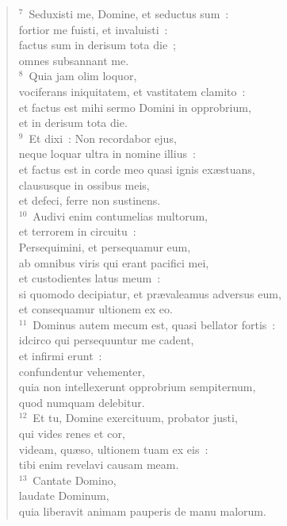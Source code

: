 \begin{flushleft}\begin{verse}${}^{7}$~Seduxisti me, Domine, et seductus sum~:\\ fortior me fuisti, et invaluisti~:\\ factus sum in derisum tota die~;\\ omnes subsannant me.\\
${}^{8}$~Quia jam olim loquor,\\ vociferans iniquitatem, et vastitatem clamito~:\\ et factus est mihi sermo Domini in opprobrium,\\ et in derisum tota die.\\
${}^{9}$~Et dixi~: Non recordabor ejus,\\ neque loquar ultra in nomine illius~:\\ et factus est in corde meo quasi ignis ex\ae stuans,\\ claususque in ossibus meis,\\ et defeci, ferre non sustinens.\\
${}^{10}$~Audivi enim contumelias multorum,\\ et terrorem in circuitu~:\\ Persequimini, et persequamur eum,\\ ab omnibus viris qui erant pacifici mei,\\ et custodientes latus meum~:\\ si quomodo decipiatur, et pr\ae valeamus adversus eum,\\ et consequamur ultionem ex eo.\\
${}^{11}$~Dominus autem mecum est, quasi bellator fortis~:\\ idcirco qui persequuntur me cadent,\\ et infirmi erunt~:\\ confundentur vehementer,\\ quia non intellexerunt opprobrium sempiternum,\\ quod numquam delebitur.\\
${}^{12}$~Et tu, Domine exercituum, probator justi,\\ qui vides renes et cor,\\ videam, qu\ae so, ultionem tuam ex eis~:\\ tibi enim revelavi causam meam.\\
${}^{13}$~Cantate Domino,\\ laudate Dominum,\\ quia liberavit animam pauperis de manu malorum.\\

\end{verse}
\end{flushleft}
